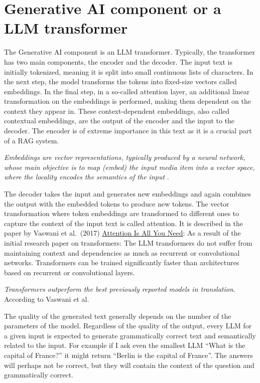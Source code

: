 \documentclass{wseas}
\begin{document}
\section{Generative AI component or a LLM transformer}

The Generative AI component is an LLM transformer. Typically, the
transformer has two main components, the encoder and the decoder. The
input text is initially tokenized, meaning it is split into small
continuous lists of characters. In the next step, the model transforms
the tokens into fixed-size vectors called embeddings. In the final step,
in a so-called attention layer, an additional linear transformation on
the embeddings is performed, making them dependent on the context they
appear in. These context-dependent embeddings, also called contextual
embeddings, are the output of the encoder and the input to the decoder.
The encoder is of extreme importance in this text as it is a crucial
part of a RAG system.

\emph{Embeddings are vector representations, typically produced by a
neural network, whose main objective is to map (embed) the input media
item into a vector space, where the locality encodes the semantics of
the input} \cite{cite2}.

The decoder takes the input and generates new embeddings and again
combines the output with the embedded tokens to produce new tokens. The
vector transformation where token embeddings are transformed to
different ones to capture the context of the input text is called
attention. It is described in the paper by Vaswani et al.~(2017)
\href{https://arxiv.org/pdf/1706.03762}{Attention Is All You Need}: As a
result of the initial research paper on transformers: The LLM
transformers do not suffer from maintaining context and dependencies as
much as recurrent or convolutional networks.
Transformers can be trained significantly faster than architectures
based on recurrent or convolutional layers.

\emph{Transformers outperform the best previously reported models in
translation.} According to Vaswani et al.~\cite{cite1}

The quality of the generated text generally depends on the number of the
parameters of the model. Regardless of the quality of the output, every
LLM for a given input is expected to generate grammatically correct text
and semantically related to the input. For example if I ask even the
smallest LLM ``What is the capital of France?'' it might return ``Berlin
is the capital of France''. The answers will perhaps not be correct, but
they will contain the context of the question and grammatically correct.
\end{document}
